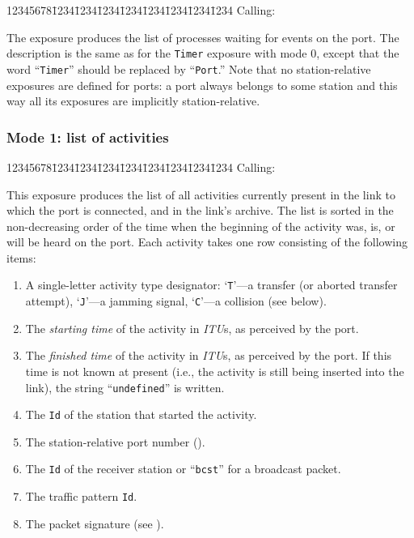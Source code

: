 {\tt\begin{tabbing}
12345678\=1234\=1234\=1234\=1234\=1234\=1234\=1234\=1234\kill
{\rm Calling:}
\end{tabbing}}

The exposure produces the
list of processes waiting for events on the port.
The description is the same as for the {\tt Timer} exposure
with mode 0, except that the word ``{\tt Timer}'' should be replaced by
``{\tt Port}.''
Note that no station-relative exposures are defined for ports: a port
always belongs to some station and this way all its exposures are
implicitly station-relative.

\subsubsection*{Mode 1: list of activities}

{\tt\begin{tabbing}
12345678\=1234\=1234\=1234\=1234\=1234\=1234\=1234\=1234\kill
{\rm Calling:}
\end{tabbing}}

This exposure produces the list of all activities currently present in the
link to which the port is connected, and in the link's archive.
The list is sorted in the non-decreasing order of the time when the
beginning of the activity was, is, or will be heard on the port.
Each activity takes one row consisting of the following items:

\begin{enumerate}
\item
A single-letter activity type designator: `{\tt T}'---a transfer (or aborted
transfer attempt), `{\tt J}'---a jamming signal, `{\tt C}'---a collision
(see below).
\item
The {\em starting time\/}
of the activity in {\em ITU\/}s, as perceived by the port.
\item
The {\em finished time\/} of the activity in {\em ITU\/}s,
as perceived by the port.
If this time is not known at present (i.e., the activity is still being
inserted into the link), the string ``{\tt undefined}'' is written. 
\item
The {\tt Id} of the station that started the activity.
\item
The station-relative port number ().
\item
The {\tt Id} of the receiver station or
``{\tt bcst}'' for a broadcast packet.
\item
The traffic pattern {\tt Id}.
\item
The packet signature (see ).
\end{enumerate}

